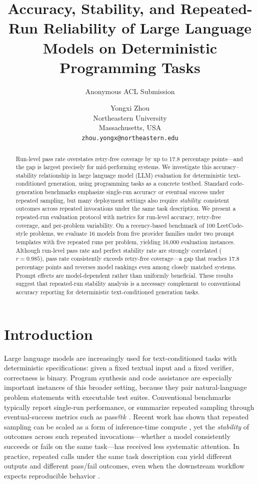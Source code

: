 \documentclass[11pt]{article}
\title{Accuracy, Stability, and Repeated-Run Reliability of Large Language Models on Deterministic Programming Tasks}
\author{Anonymous ACL Submission}
\author{
  Yongxi Zhou \\
  Northeastern University \\
  Massachusetts, USA \\
  \texttt{zhou.yongx@northeastern.edu}
}
\begin{document}
\maketitle

\begin{abstract}
Run-level pass rate overstates retry-free coverage by up to 17.8 percentage points---and the gap is largest precisely for mid-performing systems. We investigate this accuracy--stability relationship in large language model (LLM) evaluation for deterministic text-conditioned generation, using programming tasks as a concrete testbed. Standard code-generation benchmarks emphasize single-run accuracy or eventual success under repeated sampling, but many deployment settings also require \emph{stability}: consistent outcomes across repeated invocations under the same task description. We present a repeated-run evaluation protocol with metrics for run-level accuracy, retry-free coverage, and per-problem variability. On a recency-based benchmark of 100 LeetCode-style problems, we evaluate 16 models from five provider families under two prompt templates with five repeated runs per problem, yielding 16{,}000 evaluation instances. Although run-level pass rate and perfect stability rate are strongly correlated ($r=0.985$), pass rate consistently exceeds retry-free coverage---a gap that reaches 17.8 percentage points and reverses model rankings even among closely matched systems. Prompt effects are model-dependent rather than uniformly beneficial. These results suggest that repeated-run stability analysis is a necessary complement to conventional accuracy reporting for deterministic text-conditioned generation tasks.
\end{abstract}

\section{Introduction}
Large language models are increasingly used for text-conditioned tasks with deterministic specifications: given a fixed textual input and a fixed verifier, correctness is binary. Program synthesis and code assistance are especially important instances of this broader setting, because they pair natural-language problem statements with executable test suites. Conventional benchmarks typically report single-run performance, or summarize repeated sampling through eventual-success metrics such as pass@$k$ \cite{chen2021codex,austin2021program}. Recent work has shown that repeated sampling can be scaled as a form of inference-time compute \cite{brown2024large}, yet the \emph{stability} of outcomes across such repeated invocations---whether a model consistently succeeds or fails on the same task---has received less systematic attention. In practice, repeated calls under the same task description can yield different outputs and different pass/fail outcomes, even when the downstream workflow expects reproducible behavior \cite{atil2024llm,alvarado2025repetitions}.
\end{document}
